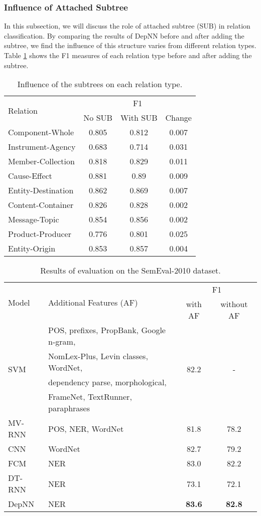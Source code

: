 \documentclass[11pt]{article}
\begin{document}
\subsubsection{Influence of Attached Subtree}
In this subsection, we will discuss the role of attached subtree (SUB) in relation classification.
 By comparing the results of DepNN before and after adding the subtree, we find the influence of this structure varies from different relation types. Table \ref{tab:SUB} shows the  F1 measures of each relation type before and after adding the subtree.
 \begin{table}[!htbp]
	\center
	\small

	\begin{tabular}{|l|ccc|}
		\hline
		\multirow{2}{*}{Relation}&
		\multicolumn{3}{c|}{F1}\\
		\cline{2-4}
		& No SUB & With SUB &Change\\
		\hline
Component-Whole&0.805&0.812&0.007\\
Instrument-Agency&0.683&0.714&0.031\\
Member-Collection&0.818&0.829&0.011\\
Cause-Effect&0.881&0.89&0.009\\
Entity-Destination&0.862&0.869&0.007\\
Content-Container&0.826&0.828&0.002\\
Message-Topic&0.854&0.856&0.002\\
Product-Producer&0.776&0.801&0.025\\
Entity-Origin&0.853&0.857&0.004\\
		\hline
	\end{tabular}
	\caption{Influence of the subtrees on each relation type.}\label{tab:SUB}
\end{table}


\begin{table*}
\center
\begin{tabular}{|l|l|cc|}
 \hline
 \multirow{2}{*}{Model} &
  \multirow{2}{*}{Additional Features (AF)} &
 \multicolumn{2}{c|}{F1}\\
  \cline{3-4}
   && with AF & without AF\\
 \hline
\multirow{4}{*}{SVM}&POS, prefixes, PropBank, Google n-gram,&\multirow{4}{*}{82.2}&\multirow{4}{*}{-}\\
&NomLex-Plus, Levin classes, WordNet,&&\\
&dependency parse, morphological,&&\\
&FrameNet, TextRunner, paraphrases&&\\
\hline
MV-RNN&POS, NER, WordNet&81.8\footnotemark[2]&78.2\\
\hline
CNN&WordNet&82.7&79.2\\
\hline
FCM&NER&83.0&82.2\\
\hline
DT-RNN&NER&73.1&72.1\\
\hline
DepNN&NER&\textbf{83.6}&\textbf{82.8}\\
\hline
 \end{tabular}
 \caption{Results of evaluation on the SemEval-2010 dataset.}\label{tab:results}
\end{table*}
\end{document}
